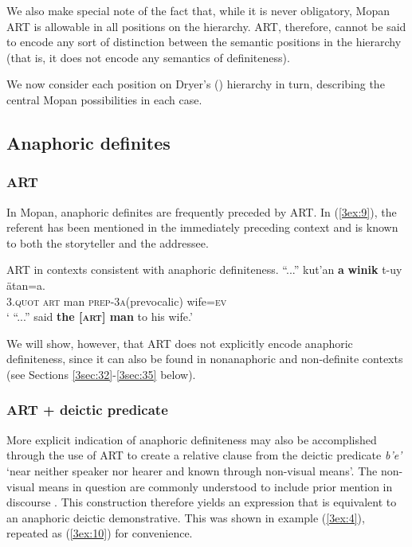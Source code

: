\documentclass[output=paper]{langsci/langscibook}
\begin{document}
We also make special note of the fact that, while it is never obligatory, Mopan ART is allowable in all positions on the hierarchy.  ART, therefore, cannot be said to encode any sort of distinction between the semantic positions in the hierarchy (that is, it does not encode any semantics of definiteness).  

We now consider each position on Dryer's (\citeyear{dryer:14}) hierarchy in turn, describing the central Mopan possibilities in each case.


\subsection{Anaphoric definites}\label{3sec:31}

\subsubsection{ART}\label{3sec:311}
In Mopan, anaphoric definites are frequently preceded by ART. In (\ref{3ex:9}), the referent has been mentioned in the immediately preceding context and is known to both the storyteller and the addressee.

\begin{exe}
\ex\label{3ex:9}
ART in contexts consistent with anaphoric definiteness. 
\exi{}
\gll	``...'' 	kut'an		{\textbf{a}}	{\textbf{winik}}		t-uy					\"atan=a. \\
	{}	3.{\textsc{quot}}	{\textsc{art}}	man			{\textsc{prep-3a}}(prevocalic)	wife{\textsc{=ev}} \\
\glt	` ``...'' said {\textbf{the [{\textsc{art}}] man}} to his wife.'
\end{exe}

We will show, however, that ART does not explicitly encode anaphoric definiteness, since it can also be found in nonanaphoric and non-definite contexts (see Sections \ref{3sec:32}-\ref{3sec:35} below). 

\subsubsection{ART + deictic predicate}\label{3sec:312}

More explicit indication of anaphoric definiteness may also be accomplished through the use of ART to create a relative clause from the deictic predicate {\emph{b'e'}} `near neither speaker nor hearer and known through non-visual means'. The non-visual means in question are commonly understood to include prior mention in discourse \citep{danziger:94}. This construction therefore yields an expression that is equivalent to an anaphoric deictic demonstrative. This was shown in example (\ref{3ex:4}), repeated as (\ref{3ex:10}) for convenience.
\end{document}
